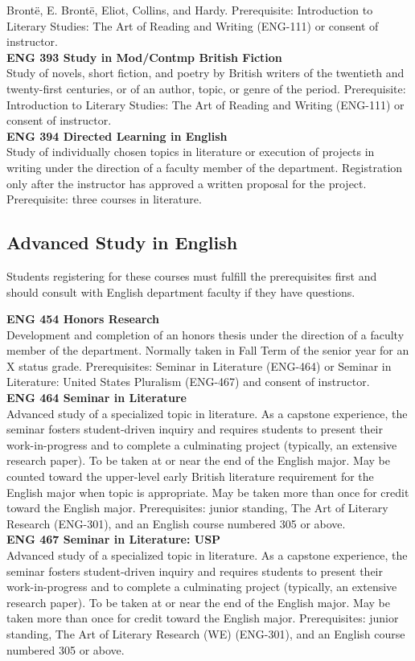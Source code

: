 \documentclass[
  letterpaper,
]{scrbook}
\begin{document}
Brontë, E. Brontë, Eliot, Collins, and Hardy. Prerequisite: Introduction
to Literary Studies: The Art of Reading and Writing (ENG-111) or consent
of instructor.\\
\textbf{ENG 393 Study in Mod/Contmp British Fiction}\\
Study of novels, short fiction, and poetry by British writers of the
twentieth and twenty-first centuries, or of an author, topic, or genre
of the period. Prerequisite: Introduction to Literary Studies: The Art
of Reading and Writing (ENG-111) or consent of instructor.\\
\textbf{ENG 394 Directed Learning in English}\\
Study of individually chosen topics in literature or execution of
projects in writing under the direction of a faculty member of the
department. Registration only after the instructor has approved a
written proposal for the project. Prerequisite: three courses in
literature.

\subsection{Advanced Study in English}\label{advanced-study-in-english}

Students registering for these courses must fulfill the prerequisites
first and should consult with English department faculty if they have
questions.

\textbf{ENG 454 Honors Research}\\
Development and completion of an honors thesis under the direction of a
faculty member of the department. Normally taken in Fall Term of the
senior year for an X status grade. Prerequisites: Seminar in Literature
(ENG-464) or Seminar in Literature: United States Pluralism (ENG-467)
and consent of instructor.\\
\textbf{ENG 464 Seminar in Literature}\\
Advanced study of a specialized topic in literature. As a capstone
experience, the seminar fosters student-driven inquiry and requires
students to present their work-in-progress and to complete a culminating
project (typically, an extensive research paper). To be taken at or near
the end of the English major. May be counted toward the upper-level
early British literature requirement for the English major when topic is
appropriate. May be taken more than once for credit toward the English
major. Prerequisites: junior standing, The Art of Literary Research
(ENG-301), and an English course numbered 305 or above.\\
\textbf{ENG 467 Seminar in Literature: USP}\\
Advanced study of a specialized topic in literature. As a capstone
experience, the seminar fosters student-driven inquiry and requires
students to present their work-in-progress and to complete a culminating
project (typically, an extensive research paper). To be taken at or near
the end of the English major. May be taken more than once for credit
toward the English major. Prerequisites: junior standing, The Art of
Literary Research (WE) (ENG-301), and an English course numbered 305 or
above.
\end{document}
